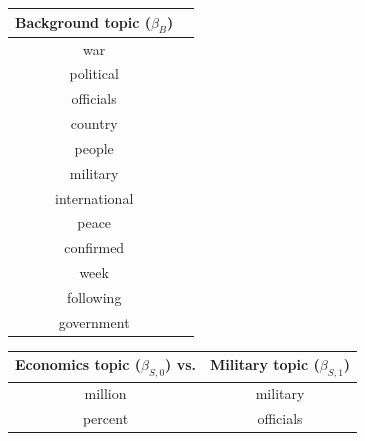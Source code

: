 \begin{table}
  \center
\begin{tabular}{|c|c|}
  \hline
  \textbf{Background topic ($\beta_{B}$)} \\
  \hline
  war \\
  political \\
  officials \\
  country \\
  people \\
  military \\
  international \\
  peace \\
  confirmed \\
  week \\
  following \\
  government \\
  \hline
\end{tabular}
\hspace{30pt} \begin{tabular}{|cc|}
  \hline
  \textbf{Economics topic ($\beta_{S,0}$) vs.} &
  \textbf{Military topic ($\beta_{S,1}$)} \\
  \hline
  million & military \\
  percent & officials \\

\end{tabular}
\end{table}
